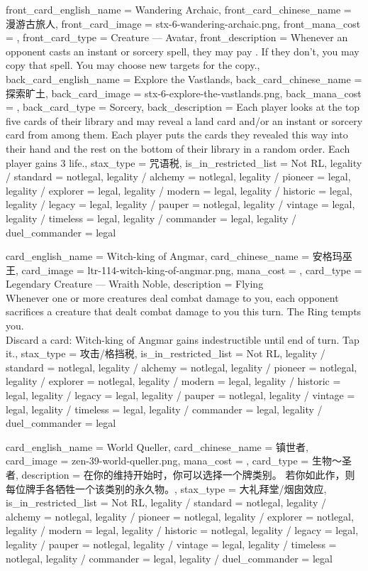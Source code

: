 \documentclass[lang = cn, color = black, 10pt]{AllThatStax}
\begin{document}
\mfcard
{
	front_card_english_name = {Wandering Archaic},
	front_card_chinese_name = {漫游古旅人},
	front_card_image = stx-6-wandering-archaic.png,
	front_mana_cost = ,
	front_card_type = Creature — Avatar,
	front_description = {Whenever an opponent casts an instant or sorcery spell, they may pay . If they don't, you may copy that spell. You may choose new targets for the copy.},
	back_card_english_name = {Explore the Vastlands},
	back_card_chinese_name = {探索旷土},
	back_card_image = stx-6-explore-the-vastlands.png,
	back_mana_cost = ,
	back_card_type = Sorcery,
	back_description = {Each player looks at the top five cards of their library and may reveal a land card and/or an instant or sorcery card from among them. Each player puts the cards they revealed this way into their hand and the rest on the bottom of their library in a random order. Each player gains 3 life.},
	stax_type = 咒语税,
	is_in_restricted_list = Not RL,
	legality / standard = notlegal,
	legality / alchemy = notlegal,
	legality / pioneer = legal,
	legality / explorer = legal,
	legality / modern = legal,
	legality / historic = legal,
	legality / legacy = legal,
	legality / pauper = notlegal,
	legality / vintage = legal,
	legality / timeless = legal,
	legality / commander = legal,
	legality / duel_commander = legal
}

\card
{
	card_english_name = {Witch-king of Angmar},
	card_chinese_name = {安格玛巫王},
	card_image = ltr-114-witch-king-of-angmar.png,
	mana_cost = ,
	card_type = Legendary Creature — Wraith Noble,
	description = {Flying\\
		Whenever one or more creatures deal combat damage to you, each opponent sacrifices a creature that dealt combat damage to you this turn. The Ring tempts you.\\
		Discard a card: Witch-king of Angmar gains indestructible until end of turn. Tap it.},
	stax_type = 攻击/格挡税,
	is_in_restricted_list = Not RL,
	legality / standard = notlegal,
	legality / alchemy = notlegal,
	legality / pioneer = notlegal,
	legality / explorer = notlegal,
	legality / modern = legal,
	legality / historic = legal,
	legality / legacy = legal,
	legality / pauper = notlegal,
	legality / vintage = legal,
	legality / timeless = legal,
	legality / commander = legal,
	legality / duel_commander = legal
}

\card
{
	card_english_name = {World Queller},
	card_chinese_name = {镇世者},
	card_image = zen-39-world-queller.png,
	mana_cost = ,
	card_type = 生物～圣者,
	description = {在你的维持开始时，你可以选择一个牌类别。 若你如此作，则每位牌手各牺牲一个该类别的永久物。},
	stax_type = 大礼拜堂/烟囱效应,
	is_in_restricted_list = Not RL,
	legality / standard = notlegal,
	legality / alchemy = notlegal,
	legality / pioneer = notlegal,
	legality / explorer = notlegal,
	legality / modern = legal,
	legality / historic = notlegal,
	legality / legacy = legal,
	legality / pauper = notlegal,
	legality / vintage = legal,
	legality / timeless = notlegal,
	legality / commander = legal,
	legality / duel_commander = legal
}
\end{document}
